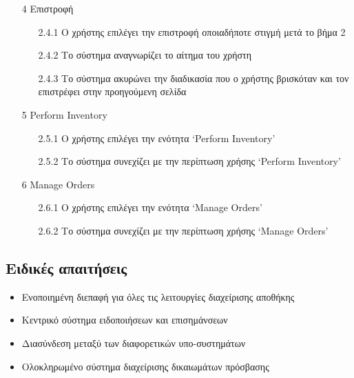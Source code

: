 \documentclass[12pt,a4paper,twoside]{book}
\begin{document}
\begin{enumerate}
  \item[4 ] Επιστροφή
        \begin{enumerate}
          \item[2.4.1 ] Ο χρήστης επιλέγει την επιστροφή οποιαδήποτε στιγμή μετά το βήμα 2 %
          \item[2.4.2 ] Το σύστημα αναγνωρίζει το αίτημα του χρήστη %
          \item[2.4.3 ] Το σύστημα ακυρώνει την διαδικασία που ο χρήστης βρισκόταν και τον επιστρέφει στην προηγούμενη σελίδα %
        \end{enumerate}
  \item[5 ] Perform Inventory
        \begin{enumerate}
          \item[2.5.1 ] Ο χρήστης επιλέγει την ενότητα `Perform Inventory'
          \item[2.5.2 ] Το σύστημα συνεχίζει με την περίπτωση χρήσης `Perform Inventory'
        \end{enumerate}
  \item[6 ] Manage Orders
        \begin{enumerate}
          \item[2.6.1 ] Ο χρήστης επιλέγει την ενότητα `Manage Orders'
          \item[2.6.2 ] Το σύστημα συνεχίζει με την περίπτωση χρήσης `Manage Orders'
        \end{enumerate}
\end{enumerate}

\subsection{Ειδικές απαιτήσεις} %
\begin{itemize}
  \item Ενοποιημένη διεπαφή για όλες τις λειτουργίες διαχείρισης αποθήκης %
  \item Κεντρικό σύστημα ειδοποιήσεων και επισημάνσεων %
  \item Διασύνδεση μεταξύ των διαφορετικών υπο-συστημάτων %
  \item Ολοκληρωμένο σύστημα διαχείρισης δικαιωμάτων πρόσβασης %
\end{itemize}
\end{document}
